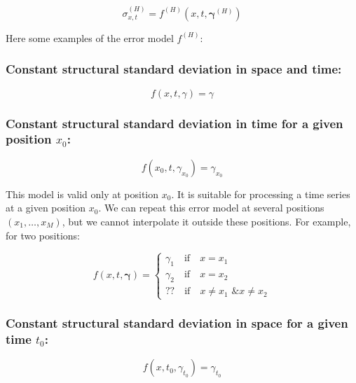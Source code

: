 \documentclass[12pt]{article}
\begin{document}
\begin{equation}
    \sigma^{(H)}_{x,t} = f^{(H)}(x,t,\boldsymbol{\gamma}^{(H)})
\end{equation}

\vspace{0.2cm}

Here some examples of the error model \(f^{(H)}\):

\subsubsection{\textbf{Constant structural standard deviation in space and time:}}

\begin{equation}
    f(x,t,\gamma) = \gamma
\end{equation}

\subsubsection{\textbf{Constant structural standard deviation in time for a given position \(x_0\):}}

\begin{equation}
    f(x_0,t,\gamma_{x_0}) = \gamma_{x_0}
\end{equation}

This model is valid only at position \(x_0\). It is suitable for processing a time series at a given position \(x_0\).
We can repeat this error model at several positions \((x_1,\ldots,x_M)\), but we cannot interpolate it outside these positions. For example, for two positions: 

\begin{equation}
    f(x,t,\boldsymbol{\gamma}) = 
    \begin{cases}
        \gamma_1 \quad \text{if} \quad x=x_1 \\
        \gamma_2 \quad \text{if} \quad x=x_2\\
        ?? \quad \text{if} \quad x \neq x_1 \text{ \& } x \neq x_2
    \end{cases}
\end{equation}

\subsubsection{\textbf{Constant structural standard deviation in space for a given time \(t_0\):}}

\begin{equation}
    f(x,t_0,\gamma_{t_0}) = \gamma_{t_0}
\end{equation}
\end{document}
